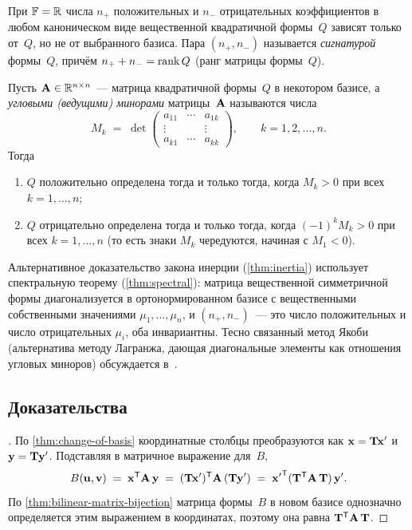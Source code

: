 \begin{theorem}
\label{thm:inertia}
При $\mathbb{F} = \mathbb{R}$ числа $n_+$ положительных и $n_-$ отрицательных
коэффициентов в любом каноническом виде вещественной квадратичной
формы~$Q$ зависят только от~$Q$, но не от выбранного базиса. Пара
$(n_+, n_-)$ называется \emph{сигнатурой} формы~$Q$, причём
$n_+ + n_- = \operatorname{rank} Q$ (ранг матрицы формы~$Q$).
\end{theorem}

\begin{theorem}
\label{thm:sylvester}
Пусть $\mathbf{A} \in \mathbb{R}^{n \times n}$~--- матрица квадратичной
формы~$Q$ в некотором базисе, а \emph{угловыми (ведущими) минорами}
матрицы~$\mathbf{A}$ называются числа
\[
  M_k \;=\; \det \begin{pmatrix} a_{11} & \cdots & a_{1k} \\ \vdots & & \vdots \\ a_{k1} & \cdots & a_{kk} \end{pmatrix},
  \qquad k = 1, 2, \dots, n.
\]
Тогда
\begin{enumerate}[label=(\alph*)]
  \item $Q$ положительно определена тогда и только тогда, когда $M_k > 0$ при всех $k = 1, \dots, n$;
  \item $Q$ отрицательно определена тогда и только тогда, когда $(-1)^k M_k > 0$ при всех $k = 1, \dots, n$
        (то есть знаки $M_k$ чередуются, начиная с $M_1 < 0$).
\end{enumerate}
\end{theorem}

\begin{remark}
Альтернативное доказательство закона инерции
(\cref{thm:inertia}) использует спектральную теорему
(\cref{thm:spectral}): матрица вещественной симметричной формы
диагонализуется в ортонормированном базисе с вещественными собственными
значениями $\mu_1, \dots, \mu_n$, и $(n_+, n_-)$~--- это число
положительных и число отрицательных $\mu_i$, оба инвариантны. Тесно
связанный метод Якоби (альтернатива методу Лагранжа, дающая
диагональные элементы как отношения угловых миноров) обсуждается
в~\cite{Beklemishev2025}.
\end{remark}

\subsection*{Доказательства}

\begin{proof}[]
По \cref{thm:change-of-basis} координатные столбцы преобразуются как
$\mathbf{x} = \mathbf{T} \mathbf{x}'$ и $\mathbf{y} = \mathbf{T} \mathbf{y}'$.
Подставляя в матричное выражение для~$B$,
\[
  B(\mathbf{u}, \mathbf{v}) \;=\; \mathbf{x}^{\mathsf{T}} \mathbf{A}\, \mathbf{y}
  \;=\; (\mathbf{T}\mathbf{x}')^{\mathsf{T}} \mathbf{A}\, (\mathbf{T}\mathbf{y}')
  \;=\; {\mathbf{x}'}^{\mathsf{T}} (\mathbf{T}^{\mathsf{T}} \mathbf{A}\, \mathbf{T})\, {\mathbf{y}'}.
\]
По \cref{thm:bilinear-matrix-bijection} матрица формы~$B$ в новом
базисе однозначно определяется этим выражением в координатах, поэтому
она равна $\mathbf{T}^{\mathsf{T}} \mathbf{A}\, \mathbf{T}$.
\end{proof}

